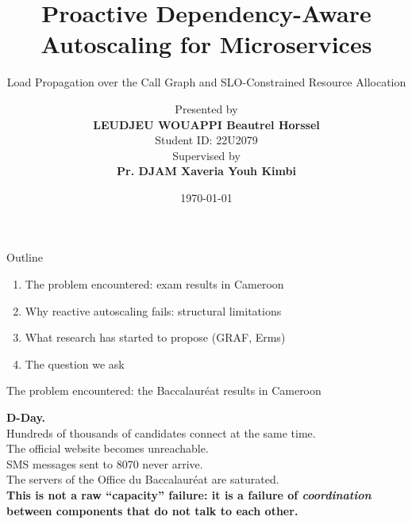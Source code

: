 \documentclass[10pt]{beamer}
\title[Proactive autoscaling]{Proactive Dependency-Aware Autoscaling for Microservices}
\subtitle{Load Propagation over the Call Graph and SLO-Constrained Resource Allocation}
\author[LEUDJEU WOUAPPI 22U2079]{Presented by\\\textbf{LEUDJEU WOUAPPI Beautrel Horssel}\\Student ID: 22U2079\\\vspace{0.3cm}Supervised by \\\textbf{Pr. DJAM Xaveria Youh Kimbi}}
\institute{University of Yaoundé I\\Faculty of Science\\Department of Computer Science}
\date{\today}
\begin{document}
\begin{frame}
  \titlepage
\end{frame}

\begin{frame}{Outline}
  \begin{enumerate}
    \item The problem encountered: exam results in Cameroon
    \item Why reactive autoscaling fails: structural limitations
    \item What research has started to propose (GRAF, Erms)
    \item The question we ask
  \end{enumerate}
\end{frame}

\begin{frame}{The problem encountered: the Baccalauréat results in Cameroon}
  \begin{center}
    \Large
    \textbf{D-Day.}\\[0.2cm]
    \normalsize
    Hundreds of thousands of candidates connect at the same time.\\
    The official website becomes unreachable.\\[0.3cm]
    SMS messages sent to 8070 never arrive.\\
    The servers of the Office du Baccalauréat are saturated.\\[0.4cm]
    \textbf{This is not a raw ``capacity'' failure: it is a failure of \emph{coordination} between components that do not talk to each other.}
  \end{center}
\end{frame}
\end{document}
